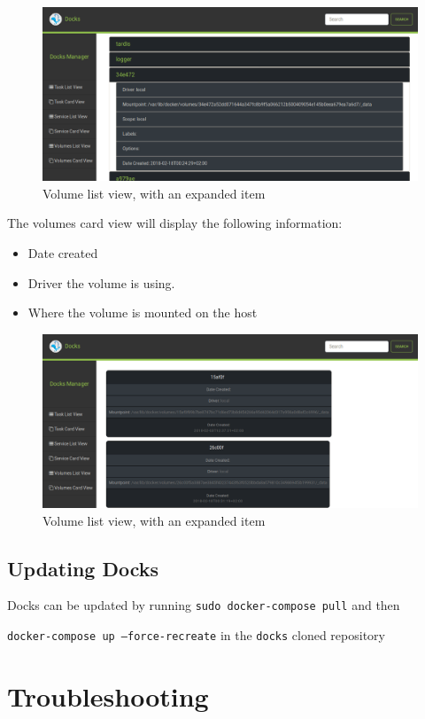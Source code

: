 \documentclass[]{article}
\providecommand{\tightlist}{%
	\setlength{\itemsep}{0pt}\setlength{\parskip}{0pt}}
\let\oldtexttt\texttt
\renewcommand{\texttt}[1]{
	\colorbox{Light}{\oldtexttt{#1}}
}
\begin{document}
\begin{figure}[H]
	\centering
	\includegraphics[scale=0.4]{volume_list.png}
	\caption{Volume list view, with an expanded item}
\end{figure}

The volumes card view will display the following information:
\begin{itemize}
	\tightlist
	\item Date created
	\item Driver the volume is using.
	\item Where the volume is mounted on the host
\end{itemize}

\begin{figure}[H]
	\centering
	\includegraphics[scale=0.4]{volume_card_view.png}
	\caption{Volume list view, with an expanded item}
\end{figure}


\subsection{Updating Docks}
Docks can be updated by running \texttt{sudo docker-compose pull} and then
\texttt{docker-compose up --force-recreate} in the \texttt{docks} cloned repository


\section{Troubleshooting}
\end{document}
